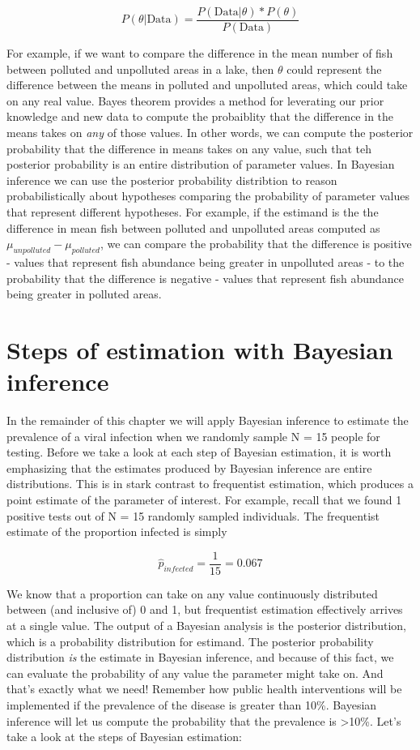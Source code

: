 \documentclass[
]{book}
\begin{document}
\[
P(\theta|\text{Data}) = \frac{P(\text{Data}|\theta)*P(\theta)}{P(\text{Data})}
\]

For example, if we want to compare the difference in the mean number
of fish between polluted and unpolluted areas in a lake, then \(\theta\)
could represent the difference between the means in polluted and
unpolluted areas, which could take on any real value. Bayes theorem
provides a method for leverating our prior knowledge and new data to
compute the probaiblity that the difference in the means takes on \emph{any}
of those values. In other words, we can compute the posterior
probability that the difference in means takes on any value, such that
teh posterior probability is an entire distribution of parameter values.
In Bayesian inference we can use the posterior probability distribtion
to reason probabilistically about hypotheses comparing the probability
of parameter values that represent different hypotheses. For example, if
the estimand is the the difference in mean fish between polluted and
unpolluted areas computed as \(\mu_{unpolluted} - \mu_{polluted}\), we can
compare the probability that the difference is positive - values that
represent fish abundance being greater in unpolluted areas - to the
probability that the difference is negative - values that represent fish
abundance being greater in polluted areas.

\section{Steps of estimation with Bayesian inference}\label{steps-of-estimation-with-bayesian-inference}

In the remainder of this chapter we will apply Bayesian inference to
estimate the prevalence of a viral infection when we randomly sample N =
15 people for testing. Before we take a look at each step of Bayesian
estimation, it is worth emphasizing that the estimates produced by
Bayesian inference are entire distributions. This is in stark contrast
to frequentist estimation, which produces a point estimate of the
parameter of interest. For example, recall that we found 1 positive
tests out of N = 15 randomly sampled individuals. The frequentist
estimate of the proportion infected is simply

\[
\hat{p}_{infected}=\frac{1}{15}=0.067
\]

We know that a proportion can take on any value continuously
distributed between (and inclusive of) 0 and 1, but frequentist
estimation effectively arrives at a single value. The output of a
Bayesian analysis is the posterior distribution, which is a probability
distribution for estimand. The posterior probability distribution \emph{is}
the estimate in Bayesian inference, and because of this fact, we can
evaluate the probability of any value the parameter might take on. And
that's exactly what we need! Remember how public health interventions
will be implemented if the prevalence of the disease is greater than
10\%. Bayesian inference will let us compute the probability that the
prevalence is \textgreater10\%. Let's take a look at the steps of Bayesian
estimation:
\end{document}

